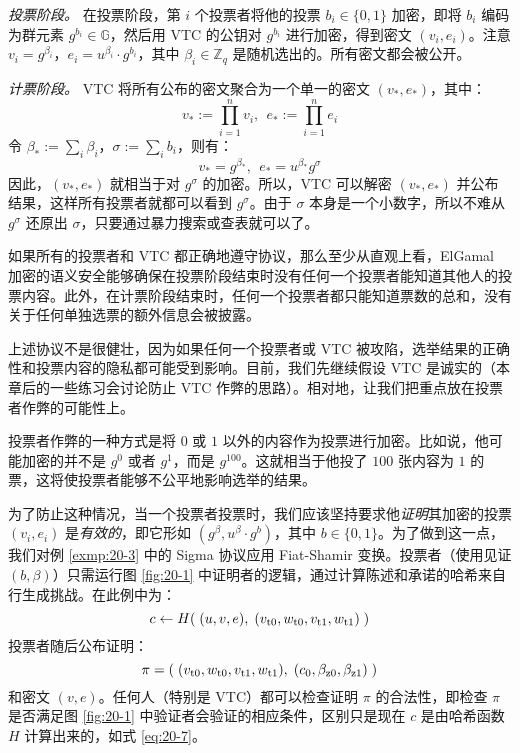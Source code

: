 \emph{投票阶段。}
在投票阶段，第 $i$ 个投票者将他的投票 $b_i\in\{0,1\}$ 加密，即将 $b_i$ 编码为群元素 $g^{b_i}\in\mathbb{G}$，然后用 VTC 的公钥对 $g^{b_i}$ 进行加密，得到密文 $(v_i,e_i)$。注意 $v_i=g^{\beta_i}$，$e_i=u^{\beta_i}\cdot g^{b_i}$，其中 $\beta_i\in\mathbb{Z}_q$ 是随机选出的。所有密文都会被公开。

\emph{计票阶段。}
VTC 将所有公布的密文聚合为一个单一的密文 $(v_*,e_*)$，其中：    
$$
v_*:=\prod_{i=1}^nv_i,~~
e_*:=\prod_{i=1}^ne_i
$$
令 $\beta_*:=\sum_i\beta_i$，$\sigma:=\sum_ib_i$，则有：
$$
v_*=g^{\beta_*},~~
e_*=u^{\beta_*}g^\sigma
$$
因此，$(v_*,e_*)$ 就相当于对 $g^\sigma$ 的加密。所以，VTC 可以解密 $(v_*,e_*)$ 并公布结果，这样所有投票者就都可以看到 $g^\sigma$。由于 $\sigma$ 本身是一个小数字，所以不难从 $g^\sigma$ 还原出 $\sigma$，只要通过暴力搜索或查表就可以了。

如果所有的投票者和 VTC 都正确地遵守协议，那么至少从直观上看，ElGamal 加密的语义安全能够确保在投票阶段结束时没有任何一个投票者能知道其他人的投票内容。此外，在计票阶段结束时，任何一个投票者都只能知道票数的总和，没有关于任何单独选票的额外信息会被披露。

上述协议不是很健壮，因为如果任何一个投票者或 VTC 被攻陷，选举结果的正确性和投票内容的隐私都可能受到影响。目前，我们先继续假设 VTC 是诚实的（本章后的一些练习会讨论防止 VTC 作弊的思路）。相对地，让我们把重点放在投票者作弊的可能性上。

投票者作弊的一种方式是将 $0$ 或 $1$ 以外的内容作为投票进行加密。比如说，他可能加密的并不是 $g^0$ 或者 $g^1$，而是 $g^{100}$。这就相当于他投了 $100$ 张内容为 $1$ 的票，这将使投票者能够不公平地影响选举的结果。

为了防止这种情况，当一个投票者投票时，我们应该坚持要求他\emph{证明}其加密的投票 $(v_i,e_i)$ 是\emph{有效的}，即它形如 $(g^\beta,u^\beta\cdot g^b)$，其中 $b\in\{0,1\}$。为了做到这一点，我们对例 \ref{exmp:20-3} 中的 Sigma 协议应用 Fiat-Shamir 变换。投票者（使用见证 $(b,\beta)$）只需运行图 \ref{fig:20-1} 中证明者的逻辑，通过计算陈述和承诺的哈希来自行生成挑战。在此例中为：
\begin{equation}\label{eq:20-7}
c\leftarrow H(\;(u,v,e),\;(v_{\rm t0},w_{\rm t0},v_{\rm t1},w_{\rm t1})\;)
\end{equation}
投票者随后公布证明：
\begin{equation}\label{eq:20-8}
\pi=(\;(v_{\rm t0},w_{\rm t0},v_{\rm t1},w_{\rm t1}),\;(c_0,\beta_{\rm z0},\beta_{\rm z1})\;)
\end{equation}
和密文 $(v,e)$。任何人（特别是 VTC）都可以检查证明 $\pi$ 的合法性，即检查 $\pi$ 是否满足图 \ref{fig:20-1} 中验证者会验证的相应条件，区别只是现在 $c$ 是由哈希函数 $H$ 计算出来的，如式 \ref{eq:20-7}。


